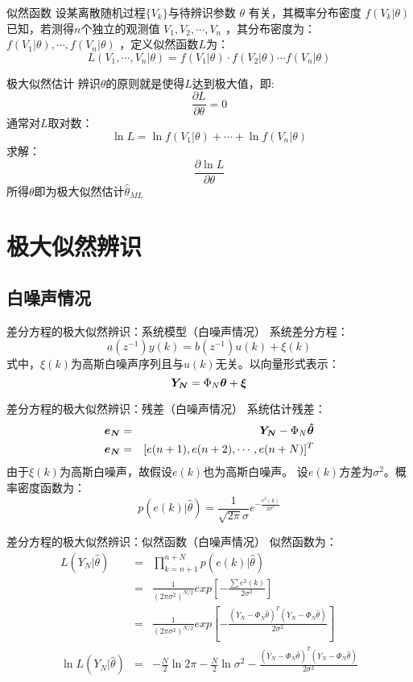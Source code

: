 \begin{frame}{似然函数}
 设某离散随机过程$\{V_k\}$与待辨识参数 $\theta$ 有关，其概率分布密度 $f(V_k|\theta)$ 已知，若测得$n$个独立的观测值 $V_1,V_2,\cdots,V_n$ ，其分布密度为： $f(V_1|\theta),\cdots,f(V_n|\theta)$ ，定义似然函数$L$为：
$$L(V_1,\cdots,V_n|\theta)=f(V_1|\theta)\cdot f(V_2|\theta)\cdots f(V_n|\theta)$$
\end{frame}

\begin{frame}{极大似然估计}
辨识$\theta$的原则就是使得$L$达到极大值，即:
$$\frac{\partial L}{\partial \theta}=0$$
通常对$L$取对数：
$$\ln L = \ln f(V_1|\theta)+\cdots + \ln f(V_n|\theta)$$
求解：
$$\frac{\partial \ln L}{\partial \theta}$$
所得$\theta$即为极大似然估计$\hat\theta_{ML}$
\end{frame}

\section{极大似然辨识}
\subsection{白噪声情况}
\begin{frame}{差分方程的极大似然辨识：系统模型（白噪声情况）}
系统差分方程：
$$a(z^{-1})y(k)=b(z^{-1})u(k)+\xi(k)$$
式中，$\xi(k)$为高斯白噪声序列且与$u(k)$无关。以向量形式表示：
$$\boldsymbol{Y_N}=\Phi_N\boldsymbol{\theta}+\boldsymbol{\xi}$$
\end{frame}

\begin{frame}{差分方程的极大似然辨识：残差（白噪声情况）}
系统估计残差：
\begin{eqnarray*}
\boldsymbol{e_N} &=& \boldsymbol{Y_N}-\Phi_N\boldsymbol{\hat\theta} \\
\boldsymbol{e_N} &=& [e(n+1),  e(n+2), \cdots, e(n+N)]^T
\end{eqnarray*}
由于$\xi(k)$为高斯白噪声，故假设$e(k)$也为高斯白噪声。
设$e(k)$方差为$\sigma^2$。概率密度函数为：
$$p(e(k)|\hat\theta)=\frac{1}{\sqrt{2\pi}\sigma}e^{-\frac{e^2(k)}{2\sigma^2}}$$
\end{frame}

\begin{frame}{差分方程的极大似然辨识：似然函数（白噪声情况）}
似然函数为：
\begin{eqnarray*}
L(Y_N|\hat\theta)&=&\prod_{k=n+1}^{n+N}p(e(k)|\hat\theta) \\
&=&\frac{1}{(2\pi\sigma^2)^{N/2}}exp[-\frac{\sum e^2(k)}{2\sigma^2}] \\
&=&\frac{1}{(2\pi\sigma^2)^{N/2}}exp[-\frac{(Y_N-\Phi_N\hat\theta)^T(Y_N-\Phi_N\hat\theta)}{2\sigma^2}] \\
\ln L(Y_N|\hat\theta)&=& -\frac{N}{2}\ln 2\pi-\frac{N}{2}\ln\sigma^2-\frac{(Y_N-\Phi_N\hat\theta)^T(Y_N-\Phi_N\hat\theta)}{2\sigma^2}
\end{eqnarray*}
\end{frame}

